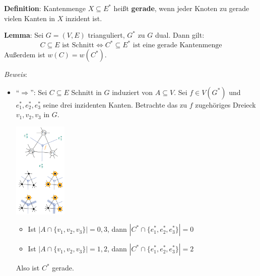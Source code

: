 \begin{enumerate}
	\textbf{Definition}: Kantenmenge $X\subseteq E^*$ heißt \textbf{gerade}, wenn jeder Knoten zu gerade vielen Kanten in $X$ inzident ist.
	
	\textbf{Lemma}: Sei $G = (V , E)$ trianguliert, $G^*$ zu $G$ dual. Dann gilt:
	$$C\subseteq E \text{ ist Schnitt} \iff C^*\subseteq E^* \text{ ist eine gerade Kantenmenge}$$
	Außerdem ist $w(C)=w(C^*)$.
		
	\textit{Beweis}: 
	\begin{itemize}
		\item \enquote{$\Rightarrow$}: Sei $C\subseteq E$ Schnitt in $G$ induziert von $A\subseteq V$. Sei $f\in V(G^*)$ und $e_1^*,e_2^*,e_3^*$ seine drei inzidenten Kanten. Betrachte das zu $f$ zugehöriges Dreieck $v_1,v_2,v_3$ in $G$.
		\begin{center}
			\includegraphics[width=0.2\textwidth]{images/mmc-3.png}
		\end{center}
		\begin{itemize}
			\item Ist $|A\cap \{v_1,v_2,v_3\}|=0,3$, dann $|C^*\cap\{e_1^*,e_2^*,e_3^*\}|=0$
			\item Ist $|A\cap \{v_1,v_2,v_3\}|=1,2$, dann $|C^*\cap\{e_1^*,e_2^*,e_3^*\}|=2$
		\end{itemize}
		
		Also ist $C^*$ gerade.
		

\end{itemize}
\end{enumerate}
